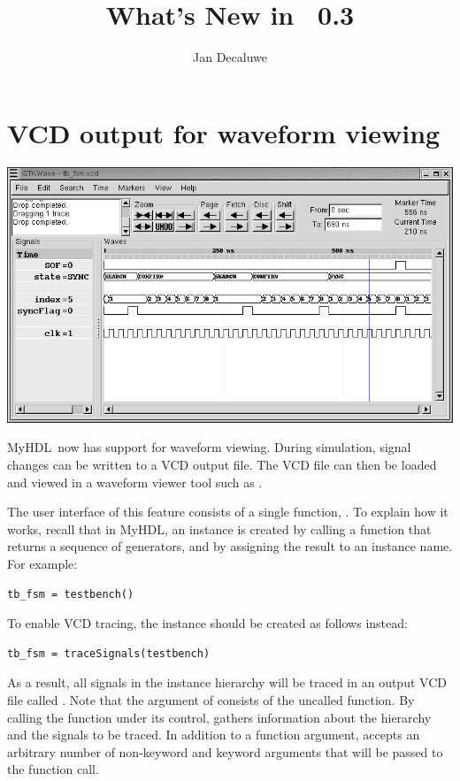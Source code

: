 \documentclass{howto}
\title{What's New in \myhdl\ 0.3}
\author{Jan Decaluwe}
\newcommand{\myhdl}{\protect \mbox{MyHDL}}
\begin{document}
\maketitle
\tableofcontents


\section{VCD output for waveform viewing\label{section-wave}}

\ifpdf
\includegraphics{tbfsm.png}
\fi

\myhdl\ now has support for waveform viewing. During simulation, signal
changes can be written to a VCD output file.  The VCD file can then be
loaded and viewed in a waveform viewer tool such as .

The user interface of this feature consists of a single function,
.  To explain how it works, recall that in
\myhdl{}, an instance is created by calling a function that returns a
sequence of generators, and by assigning the result to an instance
name. For example:

\begin{verbatim}
tb_fsm = testbench()
\end{verbatim}

To enable VCD tracing, the instance should be created as follows
instead:

\begin{verbatim}
tb_fsm = traceSignals(testbench)
\end{verbatim}

As a result, all signals in the instance hierarchy will be traced in
an output VCD file called . Note that the argument of
 consists of the uncalled function. By calling
the function under its control,  gathers
information about the hierarchy and the signals to be traced.  In
addition to a function argument,  accepts an
arbitrary number of non-keyword and keyword arguments that will be
passed to the function call.
\end{document}
